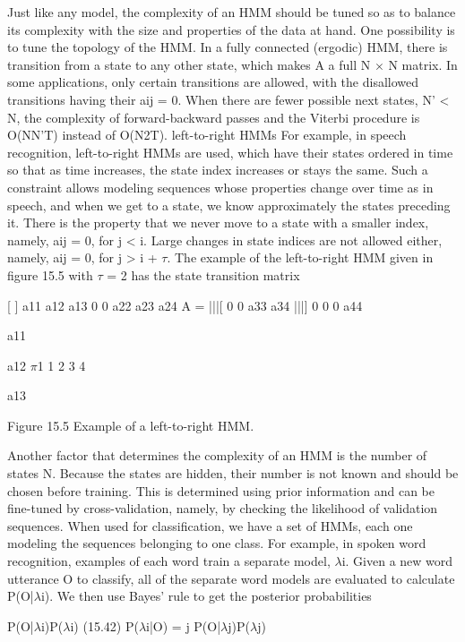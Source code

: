 Just like any model, the complexity of an HMM should be tuned so as to balance its complexity with the size and properties of the data at hand. One possibility is to tune the topology of the HMM. In a fully connected (ergodic) HMM, there is transition from a state to any other state, which makes A a full N $\times$ N matrix. In some applications, only certain transitions are allowed, with the disallowed transitions having their aij = 0. When there are fewer possible next states, N' < N, the complexity of forward-backward passes and the Viterbi procedure is O(NN'T) instead of O(N2T). left-to-right HMMs For example, in speech recognition, left-to-right HMMs are used, which have their states ordered in time so that as time increases, the state index increases or stays the same. Such a constraint allows modeling sequences whose properties change over time as in speech, and when we get to a state, we know approximately the states preceding it. There is the property that we never move to a state with a smaller index, namely, aij = 0, for j < i. Large changes in state indices are not allowed either, namely, aij = 0, for j > i + $\tau$. The example of the left-to-right HMM given in figure 15.5 with $\tau$ = 2 has the state transition matrix

[ ] a11 a12 a13 0 0 a22 a23 a24 A = |||[ 0 0 a33 a34 |||] 0 0 0 a44

a11

a12 $\pi$1 1 2 3 4

a13

Figure 15.5 Example of a left-to-right HMM.

Another factor that determines the complexity of an HMM is the number of states N. Because the states are hidden, their number is not known and should be chosen before training. This is determined using prior information and can be fine-tuned by cross-validation, namely, by checking the likelihood of validation sequences. When used for classification, we have a set of HMMs, each one modeling the sequences belonging to one class. For example, in spoken word recognition, examples of each word train a separate model, $\lambda$i. Given a new word utterance O to classify, all of the separate word models are evaluated to calculate P(O|$\lambda$i). We then use Bayes’ rule to get the posterior probabilities

P(O|$\lambda$i)P($\lambda$i) (15.42) P($\lambda$i|O) = j P(O|$\lambda$j)P($\lambda$j)


